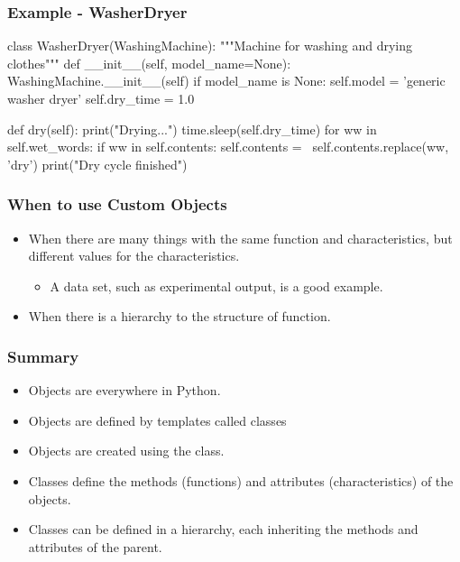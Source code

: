 \documentclass{beamer}
\begin{document}
\begin{frame}[fragile]
\frametitle{Example - WasherDryer}
\begin{code}
class WasherDryer(WashingMachine):
    """Machine for washing and drying clothes"""
    def __init__(self, model_name=None):
        WashingMachine.__init__(self)
        if model_name is None:
          self.model = 'generic washer dryer'
        self.dry_time = 1.0

    def dry(self):
        print("Drying...")
        time.sleep(self.dry_time)
        for ww in self.wet_words:
            if ww in self.contents:
                self.contents = \
                       self.contents.replace(ww, 'dry')
        print("Dry cycle finished")
        
\end{code}

\end{frame}

\begin{frame}[fragile]
\frametitle{When to use Custom Objects}
\begin{itemize}
\item When there are many things with the same function and characteristics,
but different values for the characteristics.
\pause
\begin{itemize}
\item A data set, such as experimental output, is a good example.
\pause
\end{itemize}
\item When there is a hierarchy to the structure of function.
\end{itemize}

\end{frame}

\begin{frame}[fragile]
\frametitle{Summary}
\begin{itemize}
\item Objects are everywhere in Python.
\pause
\item Objects are defined by templates called classes
\pause
\item Objects are created using the class.
\pause
\item Classes define the methods (functions) and attributes (characteristics) of the objects.
\pause
\item Classes can be defined in a hierarchy, each inheriting the methods and attributes of the parent.
\end{itemize}


\end{frame}
\end{document}
